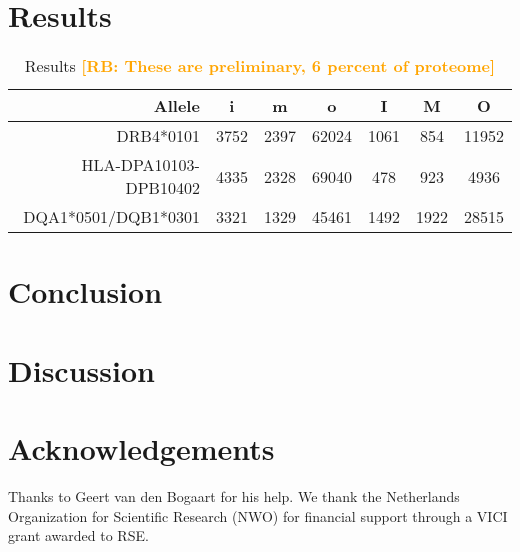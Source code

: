\documentclass{article}
\newcommand{\richel}[1]{\textcolor{orange}{\textbf{[RB: #1]}}}
\begin{document}
\section{Results}

\begin{table}
\centering
  \begin{tabular}{| r | c | c | c | c | c | c |}
    \hline
    \textbf{Allele}       & \textbf{i} & \textbf{m} & \textbf{o} & \textbf{I} & \textbf{M} & \textbf{O} \\ 
    \hline
    DRB4*0101             & 3752 & 2397 & 62024 & 1061 & 854  & 11952 \\
    HLA-DPA10103-DPB10402 & 4335 & 2328 & 69040 & 478  & 923  & 4936 \\
    DQA1*0501/DQB1*0301   & 3321 & 1329 & 45461 & 1492 & 1922 & 28515 \\
    \hline 
  \end{tabular}
  \caption{
    Results \richel{These are preliminary, 6 percent of proteome}
  }
  \label{tab:results}
\end{table}


\section{Conclusion}

\section{Discussion}



\section{Acknowledgements}

Thanks to Geert van den Bogaart for his help.
We thank the Netherlands 
Organization for Scientific Research (NWO) for financial support 
through a VICI grant awarded to RSE.
\end{document}
